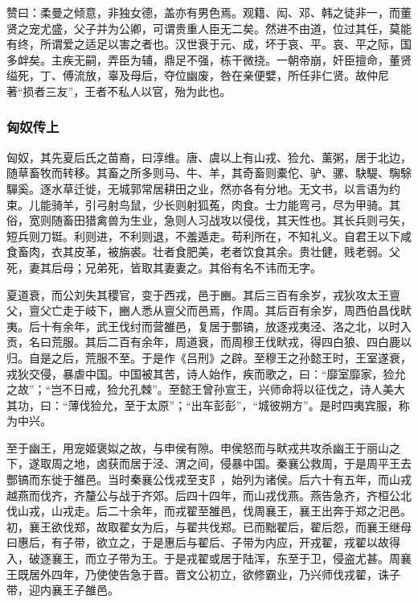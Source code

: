 \documentclass[]{article}
\begin{document}
赞曰：柔曼之倾意，非独女德，盖亦有男色焉。观籍、闳、邓、韩之徒非一，而董贤之宠尤盛，父子并为公卿，可谓贵重人臣无二矣。然进不由道，位过其任，莫能有终，所谓爱之适足以害之者也。汉世衰于元、成，坏于哀、平。哀、平之际，国多衅矣。主疾无嗣，弄臣为辅，鼎足不强，栋干微挠。一朝帝崩，奸臣擅命，董贤缢死，丁、傅流放，辜及母后，夺位幽废，咎在亲便嬖，所任非仁贤。故仲尼著``损者三友''，王者不私人以官，殆为此也。

\hypertarget{header-n6167}{%
\subsubsection{匈奴传上}\label{header-n6167}}

匈奴，其先夏后氏之苗裔，曰淳维。唐、虞以上有山戎、猃允、薰粥，居于北边，随草畜牧而转移。其畜之所多则马、牛、羊，其奇畜则橐佗、驴、骡、駃騠、騊駼驒奚。逐水草迁徙，无城郭常居耕田之业，然亦各有分地。无文书，以言语为约束。儿能骑羊，引弓射鸟鼠，少长则射狐菟，肉食。士力能弯弓，尽为甲骑。其俗，宽则随畜田猎禽兽为生业，急则人习战攻以侵伐，其天性也。其长兵则弓矢，短兵则刀铤。利则进，不利则退，不羞遁走。苟利所在，不知礼义。自君王以下咸食畜肉，衣其皮革，被旃裘。壮者食肥美，老者饮食其余。贵壮健，贱老弱。父死，妻其后母；兄弟死，皆取其妻妻之。其俗有名不讳而无字。

夏道衰，而公刘失其稷官，变于西戎，邑于豳。其后三百有余岁，戎狄攻太王亶父，亶父亡走于岐下，豳人悉从亶父而邑焉，作周。其后百有余岁，周西伯昌伐畎夷。后十有余年，武王伐纣而营雒邑，复居于酆镐，放逐戎夷泾、洛之北，以时入贡，名曰荒服。其后二百有余年，周道衰，而周穆王伐畎戎，得四白狼、四白鹿以归。自是之后，荒服不至。于是作《吕刑》之辟。至穆王之孙懿王时，王室遂衰，戎狄交侵，暴虐中国。中国被其苦，诗人始作，疾而歌之，曰：``靡室靡家，猃允之故''；``岂不日戒，猃允孔棘''。至懿王曾孙宣王，兴师命将以征伐之，诗人美大其功，曰：``薄伐猃允，至于太原''；``出车彭彭''，``城彼朔方''。是时四夷宾服，称为中兴。

至于幽王，用宠姬褒姒之故，与申侯有隙。申侯怒而与畎戎共攻杀幽王于丽山之下，遂取周之地，卤获而居于泾、渭之间，侵暴中国。秦襄公救周，于是周平王去酆镐而东徙于雒邑。当时秦襄公伐戎至支阝，始列为诸侯。后六十有五年，而山戎越燕而伐齐，齐釐公与战于齐郊。后四十四年，而山戎伐燕。燕告急齐，齐桓公北伐山戎，山戎走。后二十余年，而戎翟至雒邑，伐周襄王，襄王出奔于郑之汜邑。初，襄王欲伐郑，故取翟女为后，与翟共伐郑。已而黜翟后，翟后怨，而襄王继母曰惠后，有子带，欲立之，于是惠后与翟后、子带为内应，开戎翟，戎翟以故得入，破逐襄王，而立子带为王。于是戎翟或居于陆浑，东至于卫，侵盗尤甚。周襄王既居外四年，乃使使告急于晋。晋文公初立，欲修霸业，乃兴师伐戎翟，诛子带，迎内襄王子雒邑。
\end{document}
